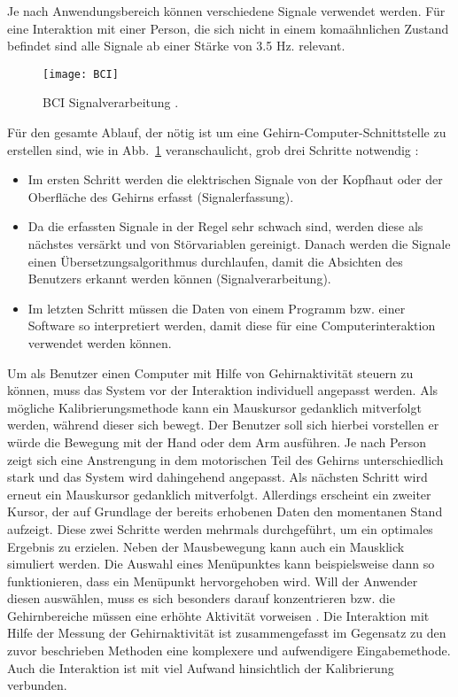 Je nach Anwendungsbereich können verschiedene Signale verwendet werden. Für eine Interaktion mit einer Person, die sich nicht in einem komaähnlichen Zustand befindet sind alle Signale ab einer Stärke von 3.5 Hz. relevant.
\newline \newline
%
%
\begin{figure}
\centering
\texttt{[image: BCI]}
\caption{BCI Signalverarbeitung \cite{BRAIN}.}
\label{fig:BCI}
\end{figure}
%
%
Für den gesamte Ablauf, der nötig ist um eine Gehirn-Computer-Schnittstelle zu erstellen sind, wie in Abb.~\ref{fig:BCI} veranschaulicht, grob drei Schritte notwendig \cite{BRAIN}:
\begin{itemize}
      \item Im ersten Schritt werden die elektrischen Signale von der Kopfhaut oder der Oberfläche des Gehirns erfasst (Signalerfassung).
      \item Da die erfassten Signale in der Regel sehr schwach sind, werden diese als nächstes versärkt und von Störvariablen gereinigt. Danach werden die Signale einen Übersetzungsalgorithmus durchlaufen, damit die Absichten des Benutzers erkannt werden können (Signalverarbeitung).
			\item Im letzten Schritt müssen die Daten von einem Programm bzw. einer Software so interpretiert werden, damit diese für eine Computerinteraktion verwendet werden können.
\end{itemize}
%
%
\newline \newline
Um als Benutzer einen Computer mit Hilfe von Gehirnaktivität steuern zu können, muss das System vor der Interaktion individuell angepasst werden. Als mögliche Kalibrierungsmethode kann ein Mauskursor gedanklich mitverfolgt werden, während dieser sich bewegt. Der Benutzer soll sich hierbei vorstellen er würde die Bewegung mit der Hand oder dem Arm ausführen. Je nach Person zeigt sich eine Anstrengung in dem motorischen Teil des Gehirns unterschiedlich stark und das System wird dahingehend angepasst. Als nächsten Schritt wird erneut ein Mauskursor gedanklich mitverfolgt. Allerdings erscheint ein zweiter Kursor, der auf Grundlage der bereits erhobenen Daten den momentanen Stand aufzeigt. Diese zwei Schritte werden mehrmals durchgeführt, um ein optimales Ergebnis zu erzielen. Neben der Mausbewegung kann auch ein Mausklick simuliert werden. Die Auswahl eines Menüpunktes kann beispielsweise dann so funktionieren, dass ein Menüpunkt hervorgehoben wird. Will der Anwender diesen auswählen, muss es sich besonders darauf konzentrieren bzw. die Gehirnbereiche müssen eine erhöhte Aktivität vorweisen \cite{BrainInt}.
\newline \newline
Die Interaktion mit Hilfe der Messung der Gehirnaktivität ist zusammengefasst im Gegensatz zu den zuvor beschrieben Methoden eine komplexere und aufwendigere Eingabemethode. Auch die Interaktion ist mit viel Aufwand hinsichtlich der Kalibrierung verbunden.
